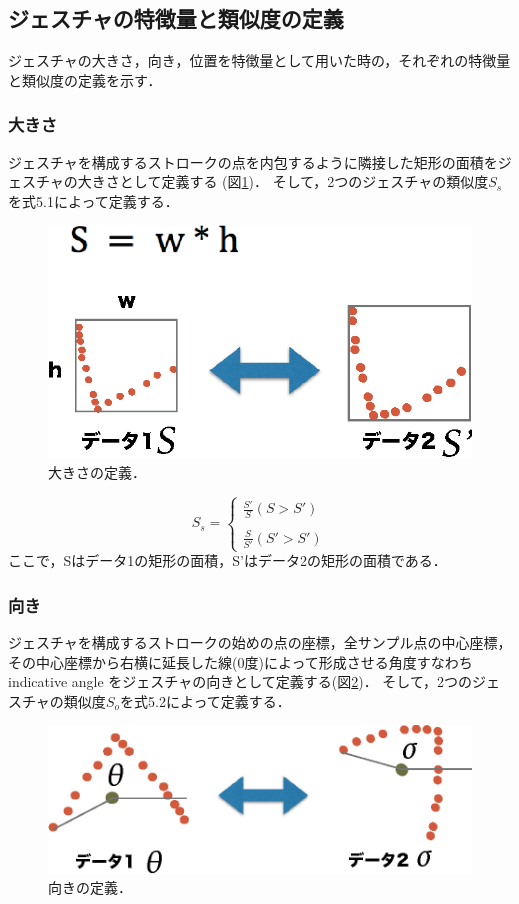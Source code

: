 \subsection{ジェスチャの特徴量と類似度の定義}
ジェスチャの大きさ，向き，位置を特徴量として用いた時の，それぞれの特徴量と類似度の定義を示す．

\subsubsection{大きさ}
ジェスチャを構成するストロークの点を内包するように隣接した矩形の面積をジェスチャの大きさとして定義する (図\ref{fig:v_size})．
そして，2つのジェスチャの類似度$S_\textit{s}$を式5.1によって定義する．

\begin{figure} [h!]
	\begin{center}
		\includegraphics [width=0.45\hsize ]{img/v_size.eps}
	\end{center}
	\caption{大きさの定義．}
	\label{fig:v_size}
\end{figure}

\begin{equation}
S_\textit{s} = \left \{
\begin{array}{l}
\frac{S'}{S} (S>S') \\\\
\frac{S}{S'} (S'>S')
\end{array}
\right.
\end{equation}
ここで，Sはデータ1の矩形の面積，S'はデータ2の矩形の面積である．

\subsubsection{向き}
ジェスチャを構成するストロークの始めの点の座標，全サンプル点の中心座標，その中心座標から右横に延長した線(0度)によって形成させる角度すなわち indicative angle をジェスチャの向きとして定義する(図\ref{fig:v_orientation})．
そして，2つのジェスチャの類似度$S_\textit{o}$を式5.2によって定義する．

\begin{figure} [h!]
	\begin{center}
		\includegraphics [width=0.6\hsize ]{img/v_orientation.eps}
	\end{center}
	\caption{向きの定義．}
	\label{fig:v_orientation}
\end{figure}

